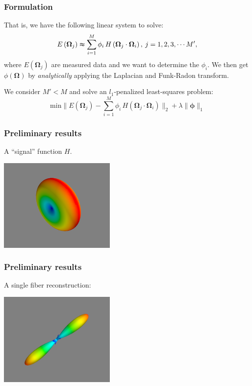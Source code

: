 \documentclass{beamer}
\begin{document}
  \frame
  {
    \frametitle{Formulation} 
    That is, we have the following linear system to solve:
    \begin{equation}
      E\left(\boldsymbol{\Omega}_{j}\right) \thickapprox\sum_{i=1}^{M}\phi_{i}\, H\left(\boldsymbol{\Omega}_{j}\cdot\boldsymbol{\Omega}_{i}\right),\: j=1,2,3,\cdots M',
    \end{equation}
    where $E\left(\boldsymbol{\Omega}_{j}\right)$ are measured data and we want to determine the $\phi_i$. We then get $\phi\left(\boldsymbol{\Omega}\right)$ by \emph{analytically} applying the Laplacian and Funk-Radon transform. 

    We consider $M' < M$ and solve an $l_1$-penalized least-squares problem:
    \begin{equation}
      \mathrm{min} \lVert E\left(\boldsymbol{\Omega}_{j}\right) - \sum_{i=1}^{M}\phi_{i}\, H\left(\boldsymbol{\Omega}_{j}\cdot\boldsymbol{\Omega}_{i}\right)\rVert_{2} + \lambda \lVert\boldsymbol{\phi}\rVert_{1}
    \end{equation}
  }
  \frame
  {
  \frametitle{Preliminary results}
  A ``signal'' function $H$.
  \vspace{-0.1in}
  \begin{center}
    \includegraphics[width = 2.25in]{snapshot.png}
  \end{center}
  }

  \frame
  {
  \frametitle{Preliminary results}
  A single fiber reconstruction:
  \vspace{-0.1in}
  \begin{center}
    \includegraphics[width = 2.25in]{odf-1.png}
  \end{center}
  }
\end{document}
